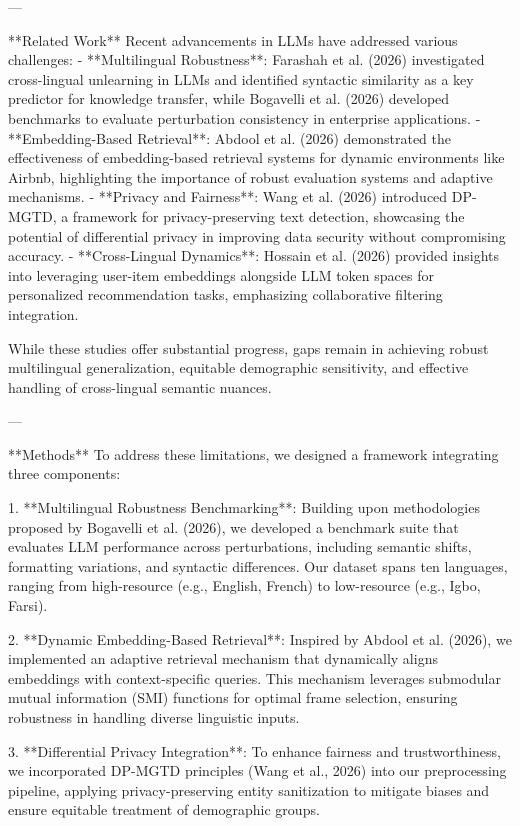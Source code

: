 ---

**Related Work**  
Recent advancements in LLMs have addressed various challenges:  
- **Multilingual Robustness**: Farashah et al. (2026) investigated cross-lingual unlearning in LLMs and identified syntactic similarity as a key predictor for knowledge transfer, while Bogavelli et al. (2026) developed benchmarks to evaluate perturbation consistency in enterprise applications.  
- **Embedding-Based Retrieval**: Abdool et al. (2026) demonstrated the effectiveness of embedding-based retrieval systems for dynamic environments like Airbnb, highlighting the importance of robust evaluation systems and adaptive mechanisms.  
- **Privacy and Fairness**: Wang et al. (2026) introduced DP-MGTD, a framework for privacy-preserving text detection, showcasing the potential of differential privacy in improving data security without compromising accuracy.  
- **Cross-Lingual Dynamics**: Hossain et al. (2026) provided insights into leveraging user-item embeddings alongside LLM token spaces for personalized recommendation tasks, emphasizing collaborative filtering integration.  

While these studies offer substantial progress, gaps remain in achieving robust multilingual generalization, equitable demographic sensitivity, and effective handling of cross-lingual semantic nuances.  

---

**Methods**  
To address these limitations, we designed a framework integrating three components:  

1. **Multilingual Robustness Benchmarking**: Building upon methodologies proposed by Bogavelli et al. (2026), we developed a benchmark suite that evaluates LLM performance across perturbations, including semantic shifts, formatting variations, and syntactic differences. Our dataset spans ten languages, ranging from high-resource (e.g., English, French) to low-resource (e.g., Igbo, Farsi).  
   
2. **Dynamic Embedding-Based Retrieval**: Inspired by Abdool et al. (2026), we implemented an adaptive retrieval mechanism that dynamically aligns embeddings with context-specific queries. This mechanism leverages submodular mutual information (SMI) functions for optimal frame selection, ensuring robustness in handling diverse linguistic inputs.  

3. **Differential Privacy Integration**: To enhance fairness and trustworthiness, we incorporated DP-MGTD principles (Wang et al., 2026) into our preprocessing pipeline, applying privacy-preserving entity sanitization to mitigate biases and ensure equitable treatment of demographic groups.  

